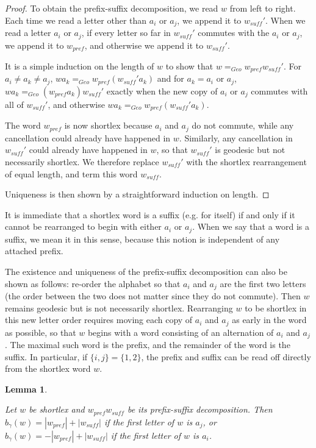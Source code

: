 \documentclass{amsart}
\newtheorem{lemma}[theorem]{Lemma}
\theoremstyle{definition}
\theoremstyle{remark}
\begin{document}
	\begin{proof}
		
		To obtain the prefix-suffix decomposition, we read $w$ from left to right. Each time we read a letter other than $a_i$ or $a_j$, we append it to $w_{suff}'$. When we read a letter $a_i$ or $a_j$, if every letter so far in $w_{suff}'$ commutes with the $a_i$ or $a_j$, we append it to $w_{pref}$, and otherwise we append it to $w_{suff}'$.
		
		It is a simple induction on the length of $w$ to show that $w=_{Geo}w_{pref}w_{suff}'$. For $a_i\ne a_k\ne a_j$, $wa_k=_{Geo}w_{pref}(w_{suff}'a_k)$ and for $a_k=a_i$ or $a_j$, $wa_k=_{Geo}(w_{pref}a_k)w_{suff}'$ exactly when the new copy of $a_i$ or $a_j$ commutes with all of $w_{suff}'$, and otherwise \newline $wa_k=_{Geo}w_{pref}(w_{suff}'a_k)$.
		
		The word $w_{pref}$ is now shortlex because $a_i$ and $a_j$ do not commute, while any cancellation could already have happened in $w$. Similarly, any cancellation in $w_{suff}'$ could already have happened in $w$, so that $w_{suff}'$ is geodesic but not necessarily shortlex. We therefore replace $w_{suff}'$ with the shortlex rearrangement of equal length, and term this word $w_{suff}$.
		
		Uniqueness is then shown by a straightforward induction on length.		
	\end{proof}
	
	It is immediate that a shortlex word is a suffix (e.g. for itself) if and only if it cannot be rearranged to begin with either $a_i$ or $a_j$. When we say that a word is a suffix, we mean it in this sense, because this notion is independent of any attached prefix.
	
	The existence and uniqueness of the prefix-suffix decomposition can also be shown as follows: re-order the alphabet so that $a_i$ and $a_j$ are the first two letters (the order between the two does not matter since they do not commute). Then $w$ remains geodesic but is not necessarily shortlex. Rearranging $w$ to be shortlex in this new letter order requires moving each copy of $a_i$ and $a_j$ as early in the word as possible, so that $w$ begins with a word consisting of an alternation of $a_i$ and $a_j$. The maximal such word is the prefix, and the remainder of the word is the suffix. In particular, if $\{i,j\}=\{1,2\}$, the prefix and suffix can be read off directly from the shortlex word $w$. 
	
	\begin{lemma} \label{CalculatingBusemannFunctions}
		
		Let $w$ be shortlex and $w_{pref}w_{suff}$ be its prefix-suffix decomposition. Then $b_\gamma(w)=|w_{pref}|+|w_{suff}|$ if the first letter of $w$ is $a_j$, or $b_\gamma(w)=-|w_{pref}|+|w_{suff}|$ if the first letter of $w$ is $a_i$.
	\end{lemma}
	
\end{document}
